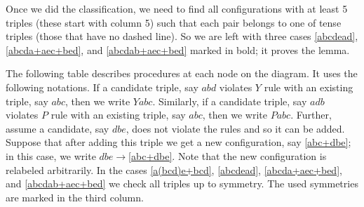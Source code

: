 \documentclass{article}
\begin{document}
Once we did the classification, we need to find all configurations with at least 5 triples (these start with column 5)
such that each pair belongs to one of tense triples (those that have no dashed line).
So we are left with three cases \ref{abcdead}, \ref{abcda+aec+bed}, and \ref{abcdab+aec+bed} marked in bold;
it proves the lemma.

The following table describes procedures at each node on the diagram.
It uses the following notations.
If a candidate triple, say $abd$ violates $Y$ rule with an existing triple, say $abc$, then we write $Yabc$.
Similarly, if a candidate triple, say $adb$ violates $P$ rule with an existing triple, say $abc$, then we write $Pabc$.
Further, assume a candidate, say $dbe$, does not violate the rules and so it can be added.
Suppose that after adding this triple we get a new configuration, say \ref{abc+dbe};
in this case, we write $dbe{\to}$\ref{abc+dbe}.
Note that the new configuration is relabeled arbitrarily.
In the cases \ref{a(bcd)e+bcd}, \ref{abcdead}, \ref{abcda+aec+bed}, and \ref{abcdab+aec+bed} we check all triples up to symmetry.
The used symmetries are marked in the third column.


\setcounter{foo}{0}
\newcommand{\myitem}{\refstepcounter{foo}\thefoo}
\end{document}
